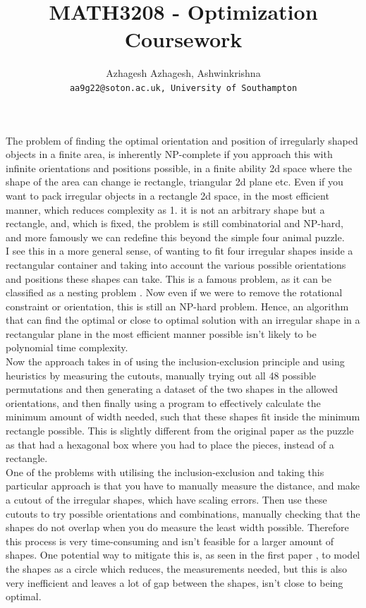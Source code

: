 \documentclass[a4paper]{article}
\title{MATH3208 - Optimization Coursework}
\author{Azhagesh
	Azhagesh, Ashwinkrishna\\
	\texttt{aa9g22@soton.ac.uk, University of Southampton}
}
\begin{document}
    \maketitle





    The problem of finding the optimal orientation and position of irregularly shaped objects in a finite area, is inherently NP-complete \cite{Nonregular} if you approach this with infinite orientations and positions possible, in a finite ability 2d space where the shape of the area can change ie rectangle, triangular 2d plane etc. Even if you want to pack irregular objects in a rectangle 2d space, in the most efficient manner, which reduces complexity as 1. it is not an arbitrary shape but a rectangle, and, which is fixed, the problem is still combinatorial and NP-hard, and more famously we can redefine this beyond the simple four animal puzzle.\\

    I see this in a more general sense, of wanting to fit four irregular shapes inside a rectangular container and taking into account the various possible orientations and positions these shapes can take. This is a famous problem, as it can be classified as a nesting problem \cite{irregular}. Now even if we were to remove the rotational constraint or orientation, this is still an NP-hard problem. Hence, an algorithm that can find the optimal or close to optimal solution with an irregular shape in a rectangular plane in the most efficient manner possible isn't likely to be polynomial time complexity.\\

    Now the approach takes in \cite{bismark} of using the inclusion-exclusion principle and using heuristics by measuring the cutouts, manually trying out all 48 possible permutations and then generating a dataset of the two shapes in the allowed orientations, and then finally using a program to effectively calculate the minimum amount of width needed, such that these shapes fit inside the minimum rectangle possible. This is slightly different from the original paper as the puzzle \cite{mongolia} as that had a hexagonal box where you had to place the pieces, instead of a rectangle.\\

    One of the problems with utilising the inclusion-exclusion and taking this particular approach is that you have to manually measure the distance, and make a cutout of the irregular shapes, which have scaling errors. Then use these cutouts to try possible orientations and combinations, manually checking that the shapes do not overlap when you do measure the least width possible. Therefore this process is very time-consuming and isn't feasible for a larger amount of shapes. One potential way to mitigate this is, as seen in the first paper \cite{mongolia}, to model the shapes as a circle which reduces, the measurements needed, but this is also very inefficient and leaves a lot of gap between the shapes, isn't close to being optimal.\\
\end{document}
